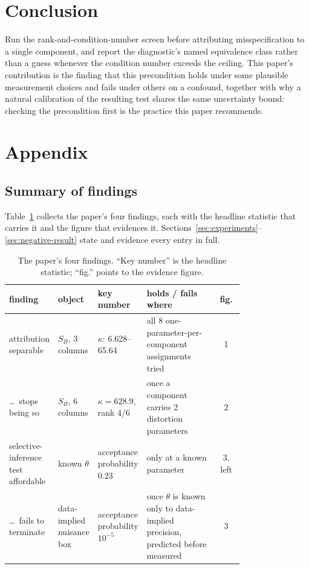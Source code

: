 \documentclass{article}
\begin{document}
\section{Conclusion}
\label{sec:conclusion}

Run the rank-and-condition-number screen before attributing misspecification to a single
component, and report the diagnostic's named equivalence class rather than a guess whenever the
condition number exceeds the ceiling. This paper's contribution is the finding that this
precondition holds under some plausible measurement choices and fails under others on a
confound, together with why a natural calibration of the resulting test shares the same
uncertainty bound: checking the precondition first is the practice this paper recommends.




\appendix
\section{Appendix}
\label{sec:appendix}

\subsection{Summary of findings}

Table~\ref{tab:summary} collects the paper's four findings, each with the headline statistic
that carries it and the figure that evidences it.
Sections~\ref{sec:experiments}--\ref{sec:negative-result} state and evidence every entry in
full.

\begin{table}[h]
\centering
\small
\setlength{\tabcolsep}{4pt}
\renewcommand{\arraystretch}{0.9}
\begin{tabular}{p{0.20\linewidth}p{0.13\linewidth}p{0.14\linewidth}p{0.30\linewidth}c}
\toprule
finding & object & key number & holds / fails where & fig. \\
\midrule
attribution separable & $S_B$, 3 columns & $\kappa$: 6.628--65.64 &
  all 8 one-parameter-per-component assignments tried & 1 \\
\dots\ stops being so & $S_B$, 6 columns & $\kappa=628.9$, rank 4/6 &
  once a component carries 2 distortion parameters & 2 \\
selective-inference test affordable & known $\theta$ & acceptance probability $0.23$ &
  only at a known parameter & 3, left \\
\dots\ fails to terminate & data-implied nuisance box & acceptance probability $10^{-5}$ &
  once $\theta$ is known only to data-implied precision, predicted before measured & 3 \\
\bottomrule
\end{tabular}
\caption{The paper's four findings. ``Key number'' is the headline statistic; ``fig.''
points to the evidence figure.}
\label{tab:summary}
\end{table}
\end{document}

